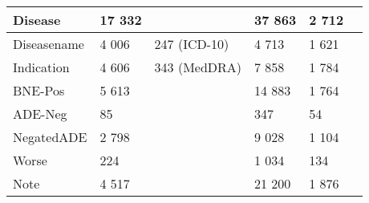 \begin{tabular}{|l|l|p{}|p{}|p{}|p{}}
\hline
Disease                                                                            & 17 332  &    & 37 863 & 2 712  \\ 
\hline
Diseasename                                                                        & 4 006  & 247 (ICD-10)    & 4 713 & 1 621  \\ 
\hline
Indication & 4 606  & 343 (MedDRA) & 7 858 & 1 784  \\ 
\hline
BNE-Pos                                                                            & 5 613  &    & 14 883 & 1 764  \\ 
\hline
ADE-Neg                                                                            & 85    &      & 347 & 54 \\ 
\hline
NegatedADE                                                                         & 2 798  &     & 9 028 & 1 104  \\ 
\hline
Worse                                                                              & 224     &      & 1 034 & 134  \\ 
\hline
Note                                                                               & 4 517  &    & 21 200 & 1 876  \\
\hline
\end{tabular}

